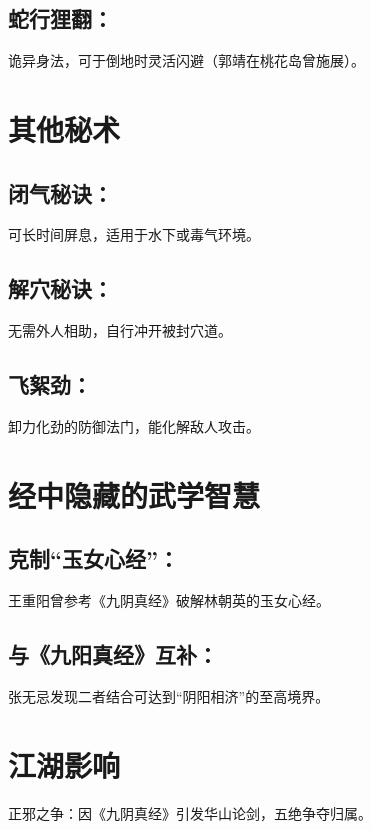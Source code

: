 \documentclass[doctor, vlined, ]{DissertUESTC}
\begin{document}
	\subsection{蛇行狸翻：}

	诡异身法，可于倒地时灵活闪避（郭靖在桃花岛曾施展）。

	\section{其他秘术}

	\subsection{闭气秘诀：}

	可长时间屏息，适用于水下或毒气环境。

	\subsection{解穴秘诀：}

	无需外人相助，自行冲开被封穴道。

	\subsection{飞絮劲：}

	卸力化劲的防御法门，能化解敌人攻击。

	\section{经中隐藏的武学智慧}

	\subsection{克制“玉女心经”：}

	王重阳曾参考《九阴真经》破解林朝英的玉女心经。

	\subsection{与《九阳真经》互补：}

	张无忌发现二者结合可达到“阴阳相济”的至高境界。

	\section{江湖影响}

	正邪之争：因《九阴真经》引发华山论剑，五绝争夺归属。
\end{document}

